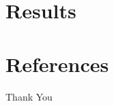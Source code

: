 \documentclass{beamer}
\begin{document}
\section{Results}


\section{References}

\begin{frame}[allowframebreaks]
    
    
    \nocite{*} %
\end{frame}

\begin{frame}
    \begin{center}
        {\Huge\calligra Thank You}
    \end{center}
\end{frame}
\end{document}

